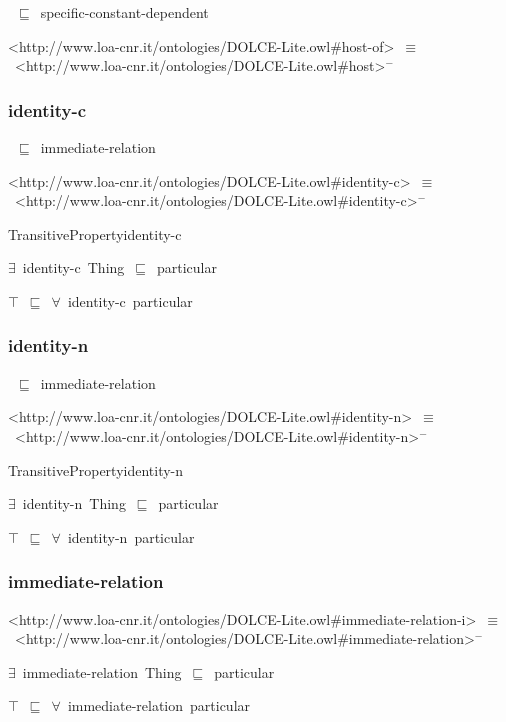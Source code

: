 \documentclass{article}
\begin{document}
~\ensuremath{\sqsubseteq}~specific-constant-dependent

<http://www.loa-cnr.it/ontologies/DOLCE-Lite.owl#host-of>~\ensuremath{\equiv}~<http://www.loa-cnr.it/ontologies/DOLCE-Lite.owl#host>\ensuremath{^-}

\subsubsection*{identity-c}

~\ensuremath{\sqsubseteq}~immediate-relation

<http://www.loa-cnr.it/ontologies/DOLCE-Lite.owl#identity-c>~\ensuremath{\equiv}~<http://www.loa-cnr.it/ontologies/DOLCE-Lite.owl#identity-c>\ensuremath{^-}

TransitivePropertyidentity-c

\ensuremath{\exists}~identity-c~Thing~\ensuremath{\sqsubseteq}~particular

\ensuremath{\top}~\ensuremath{\sqsubseteq}~\ensuremath{\forall}~identity-c~particular

\subsubsection*{identity-n}

~\ensuremath{\sqsubseteq}~immediate-relation

<http://www.loa-cnr.it/ontologies/DOLCE-Lite.owl#identity-n>~\ensuremath{\equiv}~<http://www.loa-cnr.it/ontologies/DOLCE-Lite.owl#identity-n>\ensuremath{^-}

TransitivePropertyidentity-n

\ensuremath{\exists}~identity-n~Thing~\ensuremath{\sqsubseteq}~particular

\ensuremath{\top}~\ensuremath{\sqsubseteq}~\ensuremath{\forall}~identity-n~particular

\subsubsection*{immediate-relation}

<http://www.loa-cnr.it/ontologies/DOLCE-Lite.owl#immediate-relation-i>~\ensuremath{\equiv}~<http://www.loa-cnr.it/ontologies/DOLCE-Lite.owl#immediate-relation>\ensuremath{^-}

\ensuremath{\exists}~immediate-relation~Thing~\ensuremath{\sqsubseteq}~particular

\ensuremath{\top}~\ensuremath{\sqsubseteq}~\ensuremath{\forall}~immediate-relation~particular
\end{document}
